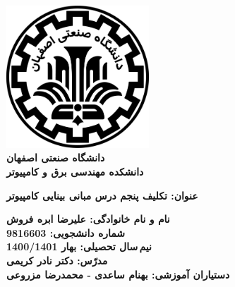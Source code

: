 \begin{titlepage}
\begin{center}
\includegraphics[width=0.4\textwidth]{figures/IUT Logo.png}\\
        
\LARGE
\textbf{دانشگاه صنعتی اصفهان}\\
\textbf{دانشکده مهندسی برق و کامپیوتر}\\
        
\vfill
        
\huge
\textbf{عنوان: تکلیف پنجم درس مبانی بینایی کامپیوتر}\\
        
\vfill
        
\LARGE
\textbf{نام و نام خانوادگی: علیرضا ابره فروش}\\
\textbf{شماره دانشجویی: 9816603}\\
\textbf{نیم\,سال تحصیلی: بهار 1400/1401}\\
\textbf{مدرّس: دکتر نادر کریمی}\\
\textbf{دستیاران آموزشی: بهنام ساعدی - محمدرضا مزروعی}\\
\end{center}
\end{titlepage}
